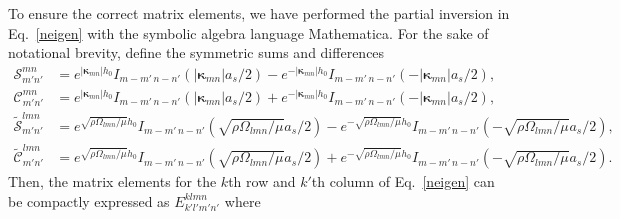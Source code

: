 \documentclass[aps,pre,amsmath,amssymb,floatfix,onecolumn,notitlepage,10pt]{revtex4-1}
\begin{document}
To ensure the correct matrix elements, we have performed the partial inversion in Eq.~\eqref{neigen} with the symbolic algebra language Mathematica.  For the sake of notational brevity, define the symmetric sums and differences
\begin{align*}
\mathcal{S}^{mn}_{m'n'} &= e^{|\bm{\kappa}_{mn}|h_0}I_{m-m'\, n-n'} \left(|\bm{\kappa}_{mn}|a_s/2\right) - e^{-|\bm{\kappa}_{mn}|h_0}I_{m-m'\, n-n'} \left(-|\bm{\kappa}_{mn}|a_s/2\right), \\
\mathcal{C}^{mn}_{m'n'} &= e^{|\bm{\kappa}_{mn}|h_0}I_{m-m'\, n-n'} \left(|\bm{\kappa}_{mn}|a_s/2\right) + e^{-|\bm{\kappa}_{mn}|h_0}I_{m-m'\, n-n'} \left(-|\bm{\kappa}_{mn}|a_s/2\right), \\
\tilde{\mathcal{S}}^{lmn}_{m'n'} &= e^{\sqrt{\rho\Omega_{lmn}/\mu}h_0}I_{m-m'\, n-n'} \left(\sqrt{\rho\Omega_{lmn}/\mu}a_s/2\right) - e^{-\sqrt{\rho\Omega_{lmn}/\mu}h_0}I_{m-m'\, n-n'} \left(-\sqrt{\rho\Omega_{lmn}/\mu}a_s/2\right),  \\
\tilde{\mathcal{C}}^{lmn}_{m'n'} &= e^{\sqrt{\rho\Omega_{lmn}/\mu}h_0}I_{m-m'\, n-n'} \left(\sqrt{\rho\Omega_{lmn}/\mu}a_s/2\right) + e^{-\sqrt{\rho\Omega_{lmn}/\mu}h_0}I_{m-m'\, n-n'} \left(-\sqrt{\rho\Omega_{lmn}/\mu}a_s/2\right).
\end{align*}
Then, the matrix elements for the $k$th row and $k'$th column of Eq.~\eqref{neigen} can be compactly expressed as $E_{k'l'm'n'}^{klmn}$ where
\end{document}
